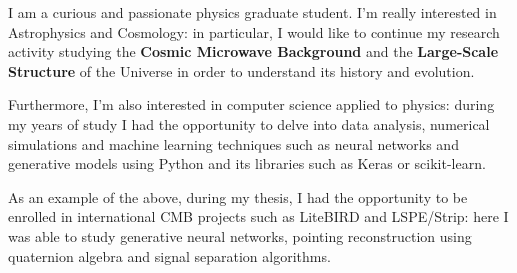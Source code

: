 
I am a curious and passionate physics graduate student. I'm really interested in Astrophysics and Cosmology: in particular, I would like to continue my research activity studying the \textbf{Cosmic Microwave Background}  and the \textbf{Large-Scale Structure} of the Universe in order to understand its history and evolution.

Furthermore, I'm also interested in computer science applied to physics: during my years of study I had the opportunity to delve into data analysis, numerical simulations and machine learning techniques such as neural networks and generative models using Python and its libraries such as Keras or scikit-learn.

As an example of the above, during my thesis, I had the opportunity to be enrolled in international CMB projects such as LiteBIRD and LSPE/Strip: here I was able to study generative neural networks, pointing reconstruction using quaternion algebra and signal separation algorithms.